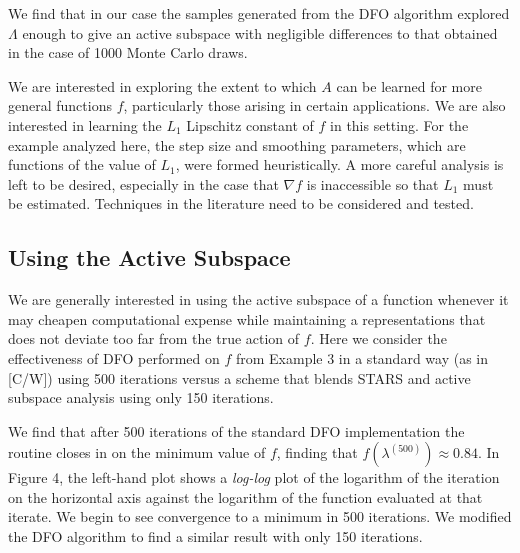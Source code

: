 \documentclass{amsart}
\begin{document}
We find that in our case the samples generated from the DFO algorithm explored $\Lambda$ enough to give an active subspace with negligible differences to that obtained in the case of 1000 Monte Carlo draws.

We are interested in exploring the extent to which $A$ can be learned for more general functions $f$, particularly those arising in certain applications. We are also interested in learning the $L_1$ Lipschitz constant of $f$ in this setting. For the example analyzed here, the step size and smoothing parameters, which are functions of the value of $L_1$, were formed heuristically. A more careful analysis is left to be desired, especially in the case that $\nabla f$ is inaccessible so that $L_1$ must be estimated. Techniques in the literature need to be considered and tested. 



\subsection{Using the Active Subspace} We are generally interested in using the active subspace of a function whenever it may cheapen computational expense while maintaining a representations that does not deviate too far from the true action of $f$. Here we consider the effectiveness of DFO performed on $f$ from Example 3 in a standard way (as in [C/W]) using 500 iterations versus a scheme that blends STARS and active subspace analysis using only 150 iterations. 



We find that after 500 iterations of the standard DFO implementation the routine closes in on the minimum value of $f$, finding that $f\left(\lambda^{(500)}\right) \approx 0.84$. In Figure 4, the left-hand plot shows a \textit{log-log} plot of the logarithm of the iteration on the horizontal axis against the logarithm of the function evaluated at that iterate. We begin to see convergence to a minimum in 500 iterations.
We modified the DFO algorithm to find a similar result with only 150 iterations. 
\end{document}
